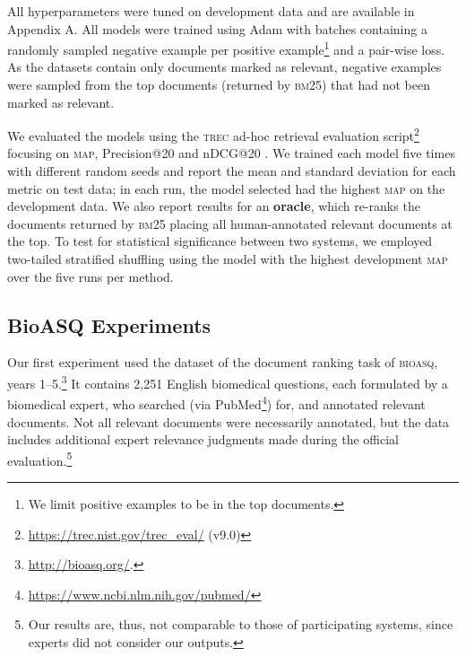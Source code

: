 \documentclass[11pt,a4paper]{article}
\newcommand{\bioasq}{\textsc{bioasq}\xspace}
\newcommand{\trec}{\textsc{trec}\xspace}
\newcommand{\bmtf}{\textsc{bm25}\xspace}
\newcommand{\map}{\textsc{map}\xspace}
\begin{document}
All hyperparameters were tuned on 
development data and are available in Appendix A.
All models were trained using Adam \cite{kingma2014adam} with batches containing a randomly sampled negative example per positive example\footnote{We limit positive 
examples to be in the top  documents.} 
and a pair-wise loss. 
As the datasets contain only documents marked as relevant, negative examples were sampled from the top  documents (returned by \bmtf) that had not been marked as relevant.

We evaluated the models using the \trec ad-hoc retrieval evaluation script\footnote{\url{https://trec.nist.gov/trec\_eval/} (v9.0)} focusing on \map, Precision@20 and nDCG@20
\cite{manning2008ir}. We trained each model five times with different random seeds and report the mean and standard deviation for each metric on test data; in each run, the model selected had the highest \map on the development data.
We also report results for an \textbf{oracle}, which re-ranks the  documents returned by \bmtf placing all human-annotated relevant documents at the top. 
To test 
for statistical significance between two systems, we employed two-tailed stratified shuffling 
\cite{smucker2007comparison,Dror2017HitchhikersGuide}
using the model with the highest development \map over the five runs per method.

\subsection{BioASQ Experiments}

Our first experiment used the dataset of the document ranking task of \bioasq \cite{tsatsaronis2015overview}, years 1--5.\footnote{\url{http://bioasq.org/}.} 
It contains 2,251 English biomedical questions,
each formulated by a biomedical expert, who  searched (via PubMed\footnote{\url{https://www.ncbi.nlm.nih.gov/pubmed/}}) for, and annotated relevant documents. Not all relevant documents were necessarily annotated, but the data includes additional expert relevance judgments made during the official evaluation.\footnote{Our results are, thus, not comparable to those of participating systems, since experts did not consider our outputs.}
\end{document}
